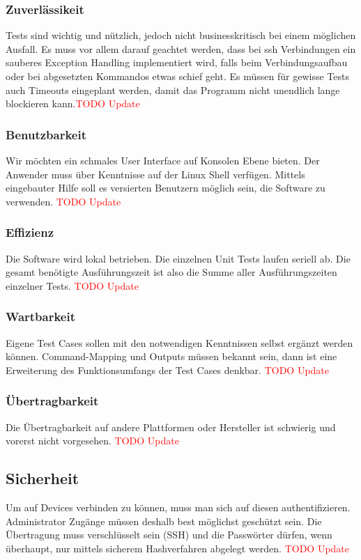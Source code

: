 \documentclass[
	ngerman,
	toc=listof, %
	toc=bibliography, %
	footnotes=multiple, %
	parskip=half, %
	numbers=noendperiod %
]{scrartcl}
\begin{document}
		\subsubsection{Zuverlässikeit}
		Tests sind wichtig und nützlich, jedoch nicht businesskritisch bei einem möglichen
		Ausfall. Es muss vor allem darauf geachtet werden, dass bei ssh Verbindungen ein
		sauberes Exception Handling implementiert wird, falls beim Verbindungsaufbau oder
		bei abgesetzten Kommandos etwas schief geht. Es müssen für gewisse Tests auch
		Timeouts eingeplant werden, damit das Programm nicht unendlich lange blockieren
		kann.\textcolor{red}{TODO Update}

		\subsubsection{Benutzbarkeit}
		Wir möchten ein schmales User Interface auf Konsolen Ebene bieten. Der Anwender
		muss über Kenntnisse auf der Linux Shell verfügen. Mittels eingebauter Hilfe soll es
		versierten Benutzern möglich sein, die Software zu verwenden. \textcolor{red}{TODO Update}

		\subsubsection{Effizienz}
		Die Software wird lokal betrieben. Die einzelnen Unit Tests laufen seriell ab. Die gesamt
		benötigte Ausführungszeit ist also die Summe aller Ausführungszeiten einzelner Tests. \textcolor{red}{TODO Update}

		\subsubsection{Wartbarkeit}
		Eigene Test Cases sollen mit den notwendigen Kenntnissen selbst ergänzt werden können. Command-Mapping und Outputs müssen bekannt sein, dann ist eine Erweiterung
		des Funktionsumfangs der Test Cases denkbar. \textcolor{red}{TODO Update}

		\subsubsection{Übertragbarkeit}
		Die Übertragbarkeit auf andere Plattformen oder Hersteller ist schwierig und vorerst
		nicht vorgesehen. \textcolor{red}{TODO Update}

	\subsection{Sicherheit}
	Um auf Devices verbinden zu können, muss man sich auf diesen authentifizieren. Administrator Zugänge müssen deshalb best möglichst geschützt sein. Die Übertragung
	muss verschlüsselt sein (SSH) und die Passwörter dürfen, wenn überhaupt, nur mittels
	sicherem Hashverfahren abgelegt werden. \textcolor{red}{TODO Update}
\end{document}
